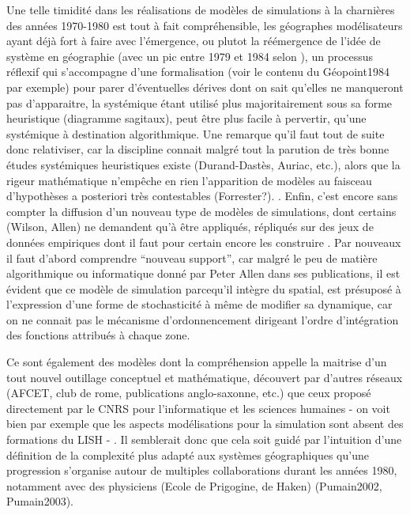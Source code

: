 Une telle timidité dans les réalisations de modèles de simulations à la charnières des années 1970-1980 est tout à fait compréhensible, les géographes modélisateurs ayant déjà fort à faire avec l'émergence, ou plutot la réémergence de l'idée de système en géographie (avec un pic entre 1979 et 1984 selon \textcite{Orain2001}), un processus réflexif qui s'accompagne d'une formalisation (voir le contenu du Géopoint1984 par exemple) pour parer d'éventuelles dérives dont on sait qu'elles ne manqueront pas d'apparaitre, la systémique étant utilisé plus majoritairement sous sa forme heuristique (diagramme sagitaux), peut être plus facile à pervertir, qu'une systémique à destination algorithmique. Une remarque qu'il faut tout de suite donc relativiser, car la discipline connait malgré tout la parution de très bonne études systémiques heuristiques existe (Durand-Dastès, Auriac, etc.), alors que la rigeur mathématique n'empêche en rien l'apparition de modèles au faisceau d'hypothèses a posteriori très contestables (Forrester?). \textcite{Orain2006}. Enfin, c'est encore sans compter la diffusion d'un nouveau type de modèles de simulations, dont certains  (Wilson, Allen) ne demandent qu'à être appliqués, répliqués sur des jeux de données empiriques dont il faut pour certain encore les construire . Par nouveaux il faut d'abord comprendre \enquote{nouveau support}, car malgré le peu de matière algorithmique ou informatique donné par Peter Allen dans ses publications, il est évident que ce modèle de simulation parcequ'il intègre du spatial, est présuposé à l'expression d'une forme de stochasticité à même de modifier sa dynamique, car on ne connait pas le mécanisme d'ordonnencement dirigeant l'ordre d'intégration des fonctions attribués à chaque zone. \autocite[231-233]{Varenne2014}

Ce sont également des modèles dont la compréhension appelle la maitrise d'un tout nouvel outillage conceptuel et mathématique, découvert par d'autres réseaux (AFCET, club de rome, publications anglo-saxonne, etc.) que ceux proposé directement par le CNRS pour l'informatique et les sciences humaines - on voit bien par exemple que les aspects modélisations pour la simulation sont absent des formations du LISH - . Il semblerait donc que cela soit guidé par l'intuition d'une définition de la complexité plus adapté aux systèmes géographiques qu'une progression s'organise autour de multiples collaborations durant les années 1980, notamment avec des physiciens (Ecole de Prigogine, de Haken) (Pumain2002, Pumain2003). 

